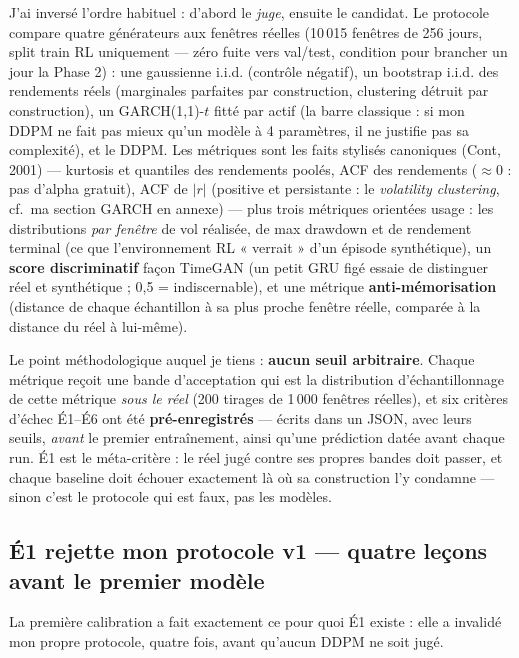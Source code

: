 \documentclass[11pt,a4paper]{article}
\begin{document}
J'ai inversé l'ordre habituel : d'abord le \emph{juge}, ensuite le candidat. Le
protocole compare quatre générateurs aux fenêtres réelles (10\,015 fenêtres de 256
jours, split train RL uniquement --- zéro fuite vers val/test, condition pour brancher
un jour la Phase 2) : une gaussienne i.i.d. (contrôle négatif), un bootstrap i.i.d.
des rendements réels (marginales parfaites par construction, clustering détruit par
construction), un GARCH(1,1)-$t$ fitté par actif (la barre classique : si mon DDPM ne
fait pas mieux qu'un modèle à 4 paramètres, il ne justifie pas sa complexité), et le
DDPM. Les métriques sont les faits stylisés canoniques (Cont, 2001) --- kurtosis et
quantiles des rendements poolés, ACF des rendements ($\approx 0$ : pas d'alpha gratuit),
ACF de $|r|$ (positive et persistante : le \emph{volatility clustering}, cf.\ ma section
GARCH en annexe) --- plus trois métriques orientées usage : les distributions
\emph{par fenêtre} de vol réalisée, de max drawdown et de rendement terminal (ce que
l'environnement RL « verrait » d'un épisode synthétique), un \textbf{score
discriminatif} façon TimeGAN (un petit GRU figé essaie de distinguer réel et
synthétique ; 0{,}5 = indiscernable), et une métrique \textbf{anti-mémorisation}
(distance de chaque échantillon à sa plus proche fenêtre réelle, comparée à la
distance du réel à lui-même).

Le point méthodologique auquel je tiens : \textbf{aucun seuil arbitraire}. Chaque
métrique reçoit une bande d'acceptation qui est la distribution d'échantillonnage de
cette métrique \emph{sous le réel} (200 tirages de 1\,000 fenêtres réelles), et six
critères d'échec É1--É6 ont été \textbf{pré-enregistrés} --- écrits dans un JSON,
avec leurs seuils, \emph{avant} le premier entraînement, ainsi qu'une prédiction datée
avant chaque run. É1 est le méta-critère : le réel jugé contre ses propres bandes doit
passer, et chaque baseline doit échouer exactement là où sa construction l'y condamne
--- sinon c'est le protocole qui est faux, pas les modèles.

\subsection{É1 rejette mon protocole v1 --- quatre leçons avant le premier modèle}

La première calibration a fait exactement ce pour quoi É1 existe : elle a invalidé mon
propre protocole, quatre fois, avant qu'aucun DDPM ne soit jugé.
\end{document}
